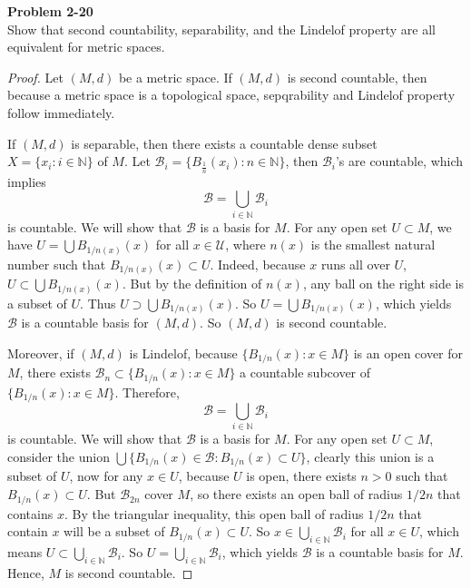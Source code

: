 \documentclass[12pt, a4paper]{article}
\theoremstyle{plain}
\newcommand{\N}{\mathbb{N}}
\newcommand{\B}{\mathscr{B}}
\newcommand{\U}{\mathscr{U}}
\newenvironment{problem}[2][Problem]
    { \begin{mdframed}[backgroundcolor=gray!20] \textbf{#1 #2} \\}
    {  \end{mdframed}}
\begin{document}
\begin{problem}{2-20}
Show that second countability, separability, and the Lindelof property are all equivalent for metric spaces.
\end{problem}
	\begin{proof}
	Let $(M,d)$ be a metric space. If $(M,d)$ is second countable, then because a metric space is a topological space, sepqrability and Lindelof property follow immediately.
	
	If $(M,d)$ is separable, then there exists a countable dense subset $X=\{x_i:i\in\N\}$ of $M$. Let $\B_i=\{B_{\frac{1}{n}}(x_i):n\in\N\}$, then $\B_i$'s are countable, which implies
	\[
	\B=\bigcup_{i\in\N}\B_i
	\]
	is countable. We will show that $\B$ is a basis for $M$. For any open set $U\subset M$, we have $U=\bigcup B_{1/n(x)}(x)$ for all $x\in \U$, where $n(x)$ is the smallest natural number such that $B_{1/n(x)}(x)\subset U$. Indeed, because $x$ runs all over $U$, $U\subset \bigcup B_{1/n(x)}(x)$. But by the definition of $n(x)$, any ball on the right side is a subset of $U$. Thus $U\supset \bigcup B_{1/n(x)}(x)$. So $U=\bigcup B_{1/n(x)}(x)$, which yields $\B$ is a countable basis for $(M,d)$. So $(M,d)$ is second countable.
	
	Moreover, if $(M,d)$ is Lindelof, because $\{B_{1/n}(x):x\in M\}$ is an open cover for $M$, there exists $\B_n\subset \{B_{1/n}(x):x\in M\}$ a countable subcover of $\{B_{1/n}(x):x\in M\}$. Therefore, 
	\[
	\B=\bigcup_{i\in\N}\B_i
	\]
	is countable. We will show that $\B$ is a basis for $M$. For any open set $U\subset M$, consider the union $\bigcup\{B_{1/n}(x)\in\B:B_{1/n}(x)\subset U\}$, clearly this union is a subset of $U$, now for any $x\in U$, because $U$ is open, there exists $n>0$ such that $B_{1/n}(x)\subset U$. But $\B_{2n}$ cover $M$, so there exists an open ball of radius $1/2n$ that contains $x$. By the triangular inequality, this open ball of radius $1/2n$ that contain $x$ will be a subset of $B_{1/n}(x)\subset U$. So $x\in \bigcup_{i\in\N}\B_i$ for all $x\in U$, which means $U\subset \bigcup_{i\in\N}\B_i$. So $U=\bigcup_{i\in\N}\B_i$, which yields $\B$ is a countable basis for $M$. Hence, $M$ is second countable.
	\end{proof}
	
\end{document}
